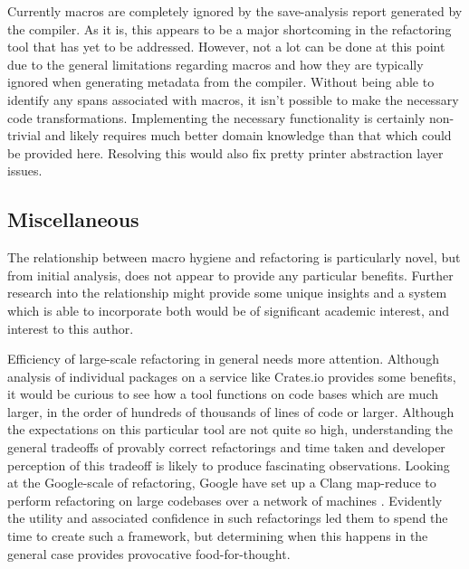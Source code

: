 
Currently macros are completely ignored by the save-analysis report generated by the compiler. As it is, this appears to be a major shortcoming in the refactoring tool that has yet to be addressed. However, not a lot can be done at this point due to the general limitations regarding macros and how they are typically ignored when generating metadata from the compiler. Without being able to identify any spans associated with macros, it isn't possible to make the necessary code transformations. Implementing the necessary functionality is certainly non-trivial and likely requires much better domain knowledge than that which could be provided here. Resolving this would also fix pretty printer abstraction layer issues.

\subsection{Miscellaneous}


The relationship between macro hygiene and refactoring is particularly novel, but from initial analysis, does not appear to provide any particular benefits. Further research into the relationship might provide some unique insights and a system which is able to incorporate both would be of significant academic interest, and interest to this author.

Efficiency of large-scale refactoring in general needs more attention. Although analysis of individual packages on a service like Crates.io provides some benefits, it would be curious to see how a tool functions on code bases which are much larger, in the order of hundreds of thousands of lines of code or larger. Although the expectations on this particular tool are not quite so high, understanding the general tradeoffs of provably correct refactorings and time taken and developer perception of this tradeoff is likely to produce fascinating observations. Looking at the Google-scale of refactoring, Google have set up a Clang map-reduce to perform refactoring on large codebases over a network of machines \cite{carruth2011clang}. Evidently the utility and associated confidence in such refactorings led them to spend the time to create such a framework, but determining when this happens in the general case provides provocative food-for-thought.

